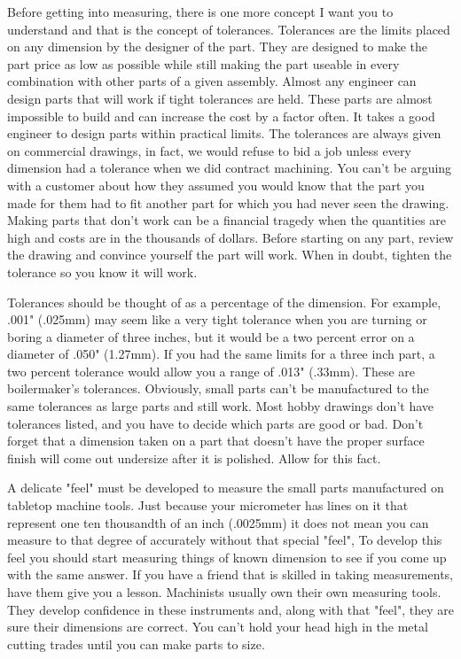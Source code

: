 
Before getting into measuring, there is one more concept I want you to
understand and that is the concept of tolerances. Tolerances are the limits
placed on any dimension by the designer of the part. They are designed to make
the part price as low as possible while still making the part useable in every
combination with other parts of a given assembly. Almost any engineer can design
parts that will work if tight tolerances are held. These parts are almost
impossible to build and can increase the cost by a factor often. It takes a good
engineer to design parts within practical limits. The tolerances are always
given on commercial drawings, in fact, we would refuse to bid a job unless every
dimension had a tolerance when we did contract machining. You can't be arguing
with a customer about how they assumed you would know that the part you made for
them had to fit another part for which you had never seen the drawing. Making
parts that don't work can be a financial tragedy when the quantities are high
and costs are in the thousands of dollars. Before starting on any part, review
the drawing and convince yourself the part will work. When in doubt, tighten the
tolerance so you know it will work.

Tolerances should be thought of as a percentage of the dimension. For example,
.001" (.025mm) may seem like a very tight tolerance when you are turning or
boring a diameter of three inches, but it would be a two percent error on a
diameter of .050" (1.27mm). If you had the same limits for a three inch part, a
two percent tolerance would allow you a range of .013" (.33mm). These are
boilermaker's tolerances. Obviously, small parts can't be manufactured to the
same tolerances as large parts and still work. Most hobby drawings don't have
tolerances listed, and you have to decide which parts are good or bad. Don't
forget that a dimension taken on a part that doesn't have the proper surface
finish will come out undersize after it is polished. Allow for this fact.


A delicate "feel" must be developed to measure the small parts manufactured on
tabletop machine tools. Just because your micrometer has lines on it that
represent one ten thousandth of an inch (.0025mm) it does not mean you can
measure to that degree of accurately without that special "feel", To develop
this feel you should start measuring things of known dimension to see if you
come up with the same answer. If you have a friend that is skilled in taking
measurements, have them give you a lesson. Machinists usually own their own
measuring tools. They develop confidence in these instruments and, along with
that "feel", they are sure their dimensions are correct. You can't hold your
head high in the metal cutting trades until you can make parts to size.

